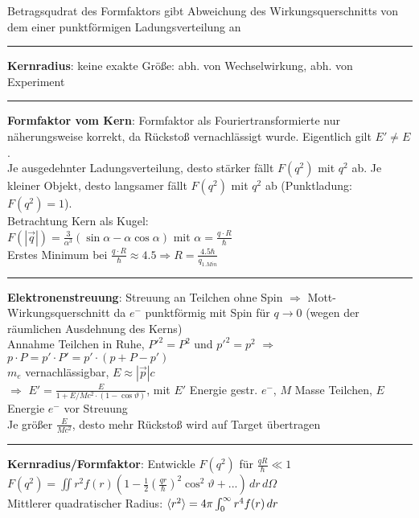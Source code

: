 \documentclass[10pt,twoside,a4paper]{article}
\begin{document}
\begin{multicols*}{3}
Betragsqudrat des Formfaktors gibt Abweichung des Wirkungsquerschnitts von dem einer punktförmigen Ladungsverteilung an
\\ \rule[0ex]{\columnwidth}{0.5pt}
\textbf{Kernradius}: keine exakte Größe: abh. von Wechselwirkung, abh. von Experiment
\\ \rule[0ex]{\columnwidth}{0.5pt}
\textbf{Formfaktor vom Kern}: Formfaktor als Fouriertransformierte nur näherungsweise korrekt, da Rückstoß vernachlässigt wurde. Eigentlich gilt $E' \neq E$. \\
Je ausgedehnter Ladungsverteilung, desto stärker fällt $F(q^2)$ mit $q^2$ ab. Je kleiner Objekt, desto langsamer fällt $F(q^2)$ mit $q^2$ ab (Punktladung: $F(q^2) = 1$). \\
Betrachtung Kern als Kugel: \\
$F\left( \left| \vec{q} \right| \right) = \frac{3}{\alpha^3} (\sin \alpha - \alpha \cos \alpha)$ mit $\alpha = \frac{q \cdot R}{\hbar}$ \\
Erstes Minimum bei $\frac{q \cdot R}{\hbar} \approx 4.5 \Rightarrow R = \frac{4.5 \hbar}{q_{1.Min}}$
\\ \rule[0ex]{\columnwidth}{0.5pt}
\textbf{Elektronenstreuung}: Streuung an Teilchen ohne Spin $\Rightarrow$ Mott-Wirkungsquerschnitt da $e^-$ punktförmig mit Spin für $q \to 0$ (wegen der räumlichen Ausdehnung des Kerns) \\
Annahme Teilchen in Ruhe, $P'^2 = P^2$ und $p'^2 = p^2$ $\Rightarrow$ $p \cdot P = p' \cdot P' = p' \cdot (p + P - p')$ \\
$m_e$ vernachlässigbar, $E \approx \left| \vec{p} \right| c$ \\
$\Rightarrow$ $E' = \frac{E}{1 + E/Mc^2 \cdot (1 - \cos \vartheta)}$, mit $E'$ Energie gestr. $e^-$, $M$ Masse Teilchen, $E$ Energie $e^-$ vor Streuung \\
Je größer $\frac{E}{Mc^2}$, desto mehr Rückstoß wird auf Target übertragen
\\ \rule[0ex]{\columnwidth}{0.5pt}
\textbf{Kernradius/Formfaktor}: Entwickle $F(q^2)$ für $\frac{qR}{\hbar} \ll 1$ \\
$F(q^2) = \iint r^2 f(r) \left( 1 - \frac{1}{2} \left( \frac{qr}{\hbar} \right)^2 \cos^2 \vartheta + ... \right) \,dr \,d\Omega$ \\
Mittlerer quadratischer Radius: $\braket{r^2} = 4\pi \int_0^{\infty} r^4 f(r) \,dr$ \\

\end{multicols*}
\end{document}
